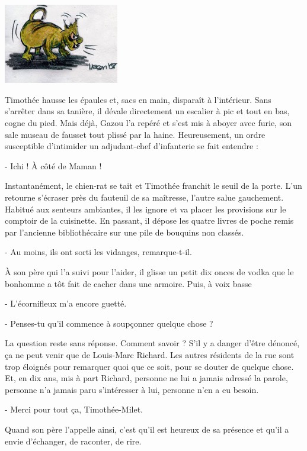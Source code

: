\begin{floatingfigure}[r]{60mm}
\includegraphics[height=35mm]{corps/chapitre4/img/gazou.jpg}
\end{floatingfigure}

Timothée hausse les épaules et, sacs en main, disparaît à l’intérieur. Sans s’arrêter dans sa tanière, il dévale directement un escalier à pic et tout en bas, cogne du pied. Mais déjà, Gazou l’a repéré et s’est mis à aboyer avec furie, son sale museau de fausset tout plissé par la haine. Heureusement, un ordre susceptible d’intimider un adjudant-chef d’infanterie se fait entendre :

- Ichi ! À côté de Maman !

Instantanément, le chien-rat se tait et Timothée franchit le seuil de la porte. L’un retourne s’écraser près du fauteuil de sa maîtresse, l’autre salue gauchement. Habitué aux senteurs ambiantes, il les ignore et va placer les provisions sur le comptoir de la cuisinette. En passant, il dépose les quatre livres de poche remis par l’ancienne bibliothécaire sur une pile de bouquins non classés.

- Au moins, ils ont sorti les vidanges, remarque-t-il.

À son père qui l’a suivi pour l’aider, il glisse un petit dix onces de vodka que le bonhomme a tôt fait de cacher dans une armoire. Puis, à voix basse

- L’écornifleux m’a encore guetté.

- Penses-tu qu’il commence à soupçonner quelque chose ?

La question reste sans réponse. Comment savoir ? S’il y a danger d’être dénoncé, ça ne peut venir que de Louis-Marc Richard. Les autres résidents de la rue sont trop éloignés pour remarquer quoi que ce soit, pour se douter de quelque chose. Et, en dix ans, mis à part Richard, personne ne lui a jamais adressé la parole, personne n’a jamais paru s’intéresser à lui, personne n’en a eu besoin.

- Merci pour tout ça, Timothée-Milet.

Quand son père l’appelle ainsi, c’est qu’il est heureux de sa présence et qu’il a envie d’échanger, de raconter, de rire.

